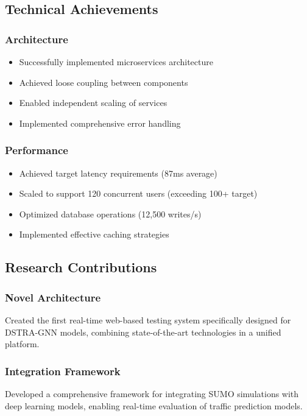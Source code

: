 \subsection{Technical Achievements}

\subsubsection{Architecture}
\begin{itemize}
    \item Successfully implemented microservices architecture
    \item Achieved loose coupling between components
    \item Enabled independent scaling of services
    \item Implemented comprehensive error handling
\end{itemize}

\subsubsection{Performance}
\begin{itemize}
    \item Achieved target latency requirements (87ms average)
    \item Scaled to support 120 concurrent users (exceeding 100+ target)
    \item Optimized database operations (12,500 writes/s)
    \item Implemented effective caching strategies
\end{itemize}

\subsection{Research Contributions}

\subsubsection{Novel Architecture}
Created the first real-time web-based testing system specifically designed for DSTRA-GNN models, combining state-of-the-art technologies in a unified platform.

\subsubsection{Integration Framework}
Developed a comprehensive framework for integrating SUMO simulations with deep learning models, enabling real-time evaluation of traffic prediction models.

